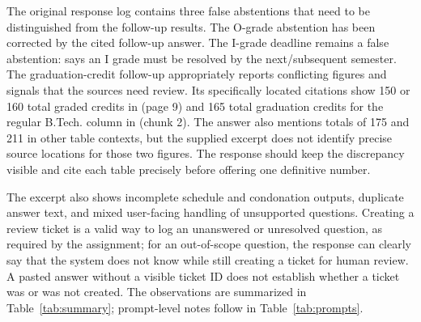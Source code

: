 \documentclass[11pt,a4paper]{article}
\begin{document}
The original response log contains three false abstentions that need to be distinguished from the follow-up results. The O-grade abstention has been corrected by the cited follow-up answer. The I-grade deadline remains a false abstention:  says an I grade must be resolved by the next/subsequent semester. The graduation-credit follow-up appropriately reports conflicting figures and signals that the sources need review. Its specifically located citations show 150 or 160 total graded credits in  (page 9) and 165 total graduation credits for the regular B.Tech. column in  (chunk 2). The answer also mentions totals of 175 and 211 in other table contexts, but the supplied excerpt does not identify precise source locations for those two figures. The response should keep the discrepancy visible and cite each table precisely before offering one definitive number.

The excerpt also shows incomplete schedule and condonation outputs, duplicate answer text, and mixed user-facing handling of unsupported questions. Creating a review ticket is a valid way to log an unanswered or unresolved question, as required by the assignment; for an out-of-scope question, the response can clearly say that the system does not know while still creating a ticket for human review. A pasted answer without a visible ticket ID does not establish whether a ticket was or was not created. The observations are summarized in Table~\ref{tab:summary}; prompt-level notes follow in Table~\ref{tab:prompts}.
\end{document}
